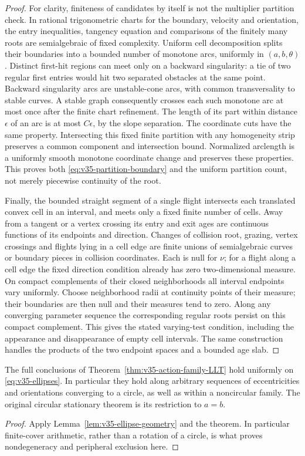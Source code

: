 \begin{proof}
For clarity, finiteness of candidates by itself is not the multiplier
partition check. In rational trigonometric charts for the boundary,
velocity and orientation, the entry inequalities, tangency equation
and comparisons of the finitely many roots are semialgebraic of fixed
complexity. Uniform cell decomposition splits their boundaries into
a bounded number of monotone arcs, uniformly in $(a,b,\theta)$.
Distinct first-hit regions can meet only on a backward singularity:
a tie of two regular first entries would hit two separated obstacles
at the same point. Backward singularity arcs are unstable-cone arcs,
with common transversality to stable curves. A stable graph consequently
crosses each such monotone arc at most once after the finite chart
refinement. The length of its part within distance $\epsilon$ of an
arc is at most $C\epsilon$, by the slope separation. The coordinate
cuts have the same property. Intersecting this fixed finite partition
with any homogeneity strip preserves a common component and
intersection bound. Normalized arclength is a uniformly smooth
monotone coordinate change and preserves these properties. This proves
both \eqref{eq:v35-partition-boundary} and the uniform partition count,
not merely piecewise continuity of the root.

Finally, the bounded straight segment of a single flight intersects
each translated convex cell in an interval, and meets only a fixed
finite number of cells. Away from a tangent or a vertex crossing its
entry and exit ages are continuous functions of its endpoints and
direction. Changes of collision root, grazing, vertex crossings and
flights lying in a cell edge are finite unions of semialgebraic curves
or boundary pieces in collision coordinates. Each is null for $\nu$;
for a flight along a cell edge the fixed direction condition already
has zero two-dimensional measure. On compact complements of their
closed neighborhoods all interval endpoints vary uniformly. Choose
neighborhood radii at continuity points of their measure; their
boundaries are then null and their measures tend to zero. Along any
converging parameter sequence the corresponding regular roots persist
on this compact complement. This gives the stated varying-test
condition, including the appearance and disappearance of empty cell
intervals. The same construction handles the products of the two
endpoint spaces and a bounded age slab.
\end{proof}

\begin{corollary}
\label{cor:v35-ellipse-local-law}
The full conclusions of Theorem~\ref{thm:v35-action-family-LLT} hold
uniformly on \eqref{eq:v35-ellipses}. In particular they hold along
arbitrary sequences of eccentricities and orientations converging to
a circle, as well as within a noncircular family. The original circular
stationary theorem is its restriction to $a=b$.
\end{corollary}
\begin{proof}
Apply Lemma~\ref{lem:v35-ellipse-geometry} and the theorem. In
particular finite-cover arithmetic, rather than a rotation of a circle,
is what proves nondegeneracy and peripheral exclusion here.
\end{proof}

